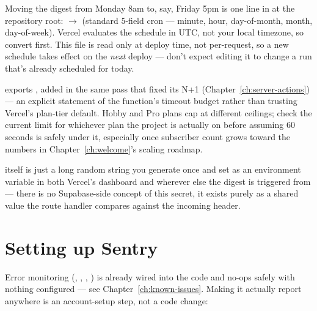 \begin{olkhowto}
Moving the digest from Monday 8am to, say, Friday 5pm is one line in  at the repository root:  $\to$  (standard 5-field cron — minute, hour, day-of-month, month, day-of-week). Vercel evaluates the schedule in UTC, not your local timezone, so convert first. This file is read only at deploy time, not per-request, so a new schedule takes effect on the \emph{next} deploy — don't expect editing it to change a run that's already scheduled for today.
\end{olkhowto}

\begin{olknote}
 exports , added in the same pass that fixed its N+1 (Chapter~\ref{ch:server-actions}) — an explicit statement of the function's timeout budget rather than trusting Vercel's plan-tier default. Hobby and Pro plans cap  at different ceilings; check the current limit for whichever plan the project is actually on before assuming 60 seconds is safely under it, especially once subscriber count grows toward the numbers in Chapter~\ref{ch:welcome}'s scaling roadmap.
\end{olknote}

 itself is just a long random string you generate once and set as an environment variable in both Vercel's dashboard and wherever else the digest is triggered from — there is no Supabase-side concept of this secret, it exists purely as a shared value the route handler compares against the incoming  header.

\section{Setting up Sentry}
\label{sec:sentry-setup}

Error monitoring (, , , ) is already wired into the code and no-ops safely with nothing configured — see Chapter~\ref{ch:known-issues}. Making it actually report anywhere is an account-setup step, not a code change:

